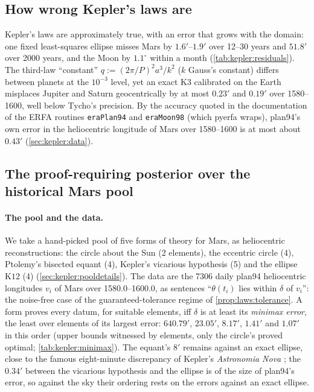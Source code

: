 \subsection{How wrong Kepler's laws are}\label{sec:kepler:wrong}

Kepler's laws are approximately true, with an error that grows with the domain: one fixed least-squares ellipse misses Mars by $1.6'$--$1.9'$ over 12--30 years and $51.8'$ over 2000 years, and the Moon by $1.1^\circ$ within a month (\cref{tab:kepler:residuals}). The third-law ``constant'' $q:=(2\pi/P)^2a^3/k^2$ ($k$ Gauss's constant) differs between planets at the $10^{-3}$ level, yet an exact $\mathrm{K3}$ calibrated on the Earth misplaces Jupiter and Saturn geocentrically by at most $0.23'$ and $0.19'$ over 1580--1600, well below Tycho's precision. By the accuracy quoted in the documentation of the ERFA routines \texttt{eraPlan94} and \texttt{eraMoon98} (which pyerfa wraps), plan94's own error in the heliocentric longitude of Mars over 1580--1600 is at most about $0.43'$ (\cref{sec:kepler:data}).

\subsection{The proof-requiring posterior over the historical Mars pool}\label{sec:kepler:pool}

\paragraph{The pool and the data.} We take a hand-picked pool of five forms of theory for Mars, as heliocentric reconstructions: the circle about the Sun (2 elements), the eccentric circle (4), Ptolemy's bisected equant (4), Kepler's vicarious hypothesis (5) and the ellipse $\mathrm{K12}$ (4) (\cref{sec:kepler:pooldetails}). The data are the 7306 daily plan94 heliocentric longitudes $v_i$ of Mars over 1580.0--1600.0, as sentences ``$\theta(t_i)$ lies within $\delta$ of $v_i$'': the noise-free case of the guaranteed-tolerance regime of \cref{prop:laws:tolerance}. A form proves every datum, for suitable elements, iff $\delta$ is at least its \emph{minimax error}, the least over elements of its largest error: $640.79'$, $23.05'$, $8.17'$, $1.41'$ and $1.07'$ in this order (upper bounds witnessed by elements, only the circle's proved optimal; \cref{tab:kepler:minimax}). The equant's $8'$ remains against an exact ellipse, close to the famous eight-minute discrepancy of Kepler's \emph{Astronomia Nova} \citep{kepler1992new}; the $0.34'$ between the vicarious hypothesis and the ellipse is of the size of plan94's error, so against the sky their ordering rests on the errors against an exact ellipse.

